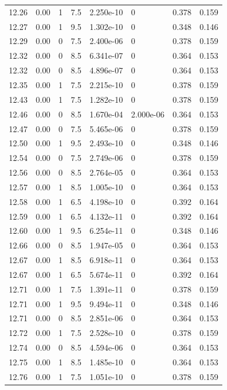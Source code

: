\documentclass[preview]{standalone}
\begin{document}
{{{{{{{{{\begin{tabular}{L{1.2cm}C{1.2cm} C{0.3cm}C{0.5cm} C{1.4cm}C{1.4cm} C{1.4cm}C{1.4cm}}
  12.26  &  0.00  & 1     & 7.5 &  2.250e-10  & 0  & 0.378 &  0.159   \\ 
  12.27  &  0.00  & 1     & 9.5 &  1.302e-10  & 0  & 0.348 &  0.146   \\ 
  12.29  &  0.00  & 0     & 7.5 &  2.400e-06  & 0  & 0.378 &  0.159   \\ 
  12.32  &  0.00  & 0     & 8.5 &  6.341e-07  & 0  & 0.364 &  0.153   \\ 
  12.32  &  0.00  & 0     & 8.5 &  4.896e-07  & 0  & 0.364 &  0.153   \\ 
  12.35  &  0.00  & 1     & 7.5 &  2.215e-10  & 0  & 0.378 &  0.159   \\ 
  12.43  &  0.00  & 1     & 7.5 &  1.282e-10  & 0  & 0.378 &  0.159   \\ 
  12.46  &  0.00  & 0     & 8.5 &  1.670e-04  & 2.000e-06  & 0.364 &  0.153   \\ 
  12.47  &  0.00  & 0     & 7.5 &  5.465e-06  & 0  & 0.378 &  0.159   \\ 
  12.50  &  0.00  & 1     & 9.5 &  2.493e-10  & 0  & 0.348 &  0.146   \\ 
  12.54  &  0.00  & 0     & 7.5 &  2.749e-06  & 0  & 0.378 &  0.159   \\ 
  12.56  &  0.00  & 0     & 8.5 &  2.764e-05  & 0  & 0.364 &  0.153   \\ 
  12.57  &  0.00  & 1     & 8.5 &  1.005e-10  & 0  & 0.364 &  0.153   \\ 
  12.58  &  0.00  & 1     & 6.5 &  4.198e-10  & 0  & 0.392 &  0.164   \\ 
  12.59  &  0.00  & 1     & 6.5 &  4.132e-11  & 0  & 0.392 &  0.164   \\ 
  12.60  &  0.00  & 1     & 9.5 &  6.254e-11  & 0  & 0.348 &  0.146   \\ 
  12.66  &  0.00  & 0     & 8.5 &  1.947e-05  & 0  & 0.364 &  0.153   \\ 
  12.67  &  0.00  & 1     & 8.5 &  6.918e-11  & 0  & 0.364 &  0.153   \\ 
  12.67  &  0.00  & 1     & 6.5 &  5.674e-11  & 0  & 0.392 &  0.164   \\ 
  12.71  &  0.00  & 1     & 7.5 &  1.391e-11  & 0  & 0.378 &  0.159   \\ 
  12.71  &  0.00  & 1     & 9.5 &  9.494e-11  & 0  & 0.348 &  0.146   \\ 
  12.71  &  0.00  & 0     & 8.5 &  2.851e-06  & 0  & 0.364 &  0.153   \\ 
  12.72  &  0.00  & 1     & 7.5 &  2.528e-10  & 0  & 0.378 &  0.159   \\ 
  12.74  &  0.00  & 0     & 8.5 &  4.594e-06  & 0  & 0.364 &  0.153   \\ 
  12.75  &  0.00  & 1     & 8.5 &  1.485e-10  & 0  & 0.364 &  0.153   \\ 
  12.76  &  0.00  & 1     & 7.5 &  1.051e-10  & 0  & 0.378 &  0.159   \\ 
\hline 
\end{tabular} 

}}}}}}}}}
\end{document}
